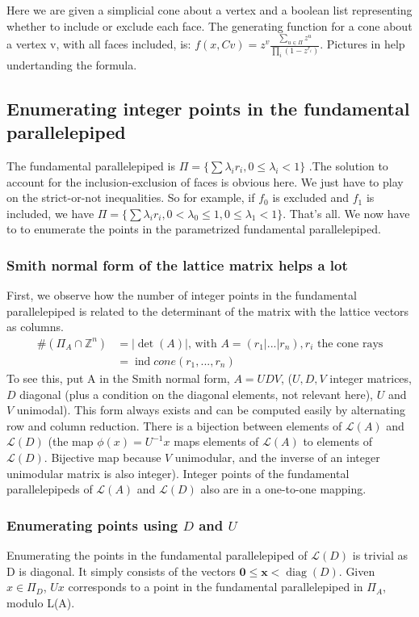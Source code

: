\documentclass[14pt]{article}
\renewcommand{\vec}[1]{\mathbf{#1}}
\newcommand{\Z}{\mathbb{Z}}
\renewcommand{\L}{\mathcal{L}}
\newcommand{\diag}{\mathop{\mathrm{diag}}}
\newcommand{\ind}{\mathop{\mathrm{ind}}}
\begin{document}
Here we are given a simplicial cone about a vertex and a boolean list representing whether to include or exclude each face.
The generating function for a cone about a vertex v, with all faces included, is: $f(x,Cv) = z^v \frac {\sum_{u \in \Pi} z^u}{\prod_i (1 - z^{r_i})}$. Pictures in \cite{Yoshida} help undertanding the formula.

\subsection*{Enumerating integer points in the fundamental parallelepiped}
The fundamental parallelepiped is $\Pi = \{\sum \lambda_i r_i, 0 \le \lambda_i < 1\}$ .The solution to account for the inclusion-exclusion of faces is obvious here. We just have to play on the strict-or-not inequalities. So for example, if $f_0$ is excluded and $f_1$ is included, we have $\Pi = \{\sum \lambda_i r_i, 0 < \lambda_0 \le 1, 0 \le \lambda_1 < 1\}$. That's all. We now have to to enumerate the points in the parametrized fundamental parallelepiped.


\subsubsection*{Smith normal form of the lattice matrix helps a lot}
First, we observe how the number of integer points in the fundamental parallelepiped is related to the determinant of the matrix with the lattice vectors as columns.
\begin{align*}
  \#\left(\Pi_{A}\cap \Z^n\right) &= |\det(A)|\text{, with } A = (r_1 | ... | r_n), r_i\text{ the cone rays}\\
  &= \ind cone(r_1,..., r_n)
\end{align*}
To see this, put A in the Smith normal form,  $A = U D V$, ($U,D,V$ integer matrices, $D$ diagonal (plus a condition on the diagonal elements, not relevant here), $U$ and $V$ unimodal). This form always exists and can be computed easily by alternating row and column reduction.
There is a bijection between elements of $\L(A)$ and $\L(D)$ (the map $\phi(x) = U^{-1} x$ maps elements of $\L(A)$ to elements of $\L(D)$. Bijective map because $V$ unimodular, and the inverse of an integer unimodular matrix is also integer).
Integer points of the fundamental parallelepipeds of $\L(A)$ and $\L(D)$ also are in a one-to-one mapping.


\subsubsection*{Enumerating points using $D$ and $U$}
Enumerating the points in the fundamental parallelepiped of $\L(D)$ is trivial as D is diagonal. It simply consists of the vectors $\vec 0 \le \vec x < \diag(D)$.
Given $x \in \Pi_D$, $Ux$ corresponds to a point in the fundamental parallelepiped in $\Pi_A$, modulo L(A).
\end{document}
